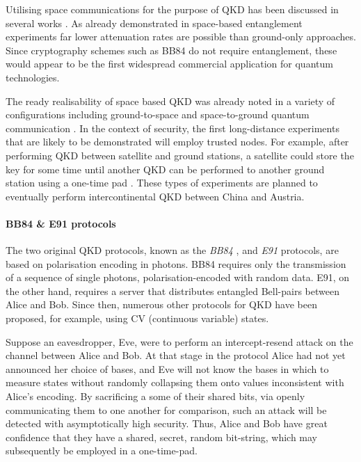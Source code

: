 Utilising space communications for the purpose of QKD has been discussed in several works \cite{bib:hughes2000quantum, bib:rarity2002ground, bib:pfennigbauer2003free, bib:aspelmeyer2003long, bib:armengol08}. As already demonstrated in space-based entanglement experiments \cite{bib:yin2017satellite, bib:ren2017ground, bib:liao2017satellite} far lower attenuation rates are possible than ground-only approaches. Since cryptography schemes such as BB84 do not require entanglement, these would appear to be the first widespread commercial application for quantum technologies.  

The ready realisability of space based QKD was already noted in a variety of configurations including ground-to-space and space-to-ground quantum communication \cite{bib:rarity2002ground, bib:aspelmeyer2003long}. In the context of security, the first long-distance experiments that are likely to be demonstrated will employ trusted nodes. For example, after performing QKD between satellite and ground stations, a satellite could store the key for some time until another QKD can be performed to another ground station using a one-time pad \cite{bib:liao2017satellite}. These types of experiments are planned to eventually perform intercontinental QKD between China and Austria.  

%
%

\paragraph{BB84 \& E91 protocols}

The two original QKD protocols, known as the \textit{BB84} \cite{bib:BennetBrassard84}, and \textit{E91} \cite{bib:Ekert91} protocols, are based on polarisation encoding in photons. BB84 requires only the transmission of a sequence of single photons, polarisation-encoded with random data. E91, on the other hand, requires a server that distributes entangled Bell-pairs between Alice and Bob. Since then, numerous other protocols for QKD have been proposed, for example, using CV (continuous variable) states.

Suppose an eavesdropper, Eve, were to perform an intercept-resend attack on the channel between Alice and Bob. At that stage in the protocol Alice had not yet announced her choice of bases, and Eve will not know the bases in which to measure states without randomly collapsing them onto values inconsistent with Alice's encoding. By sacrificing a some of their shared bits, via openly communicating them to one another for comparison, such an attack will be detected with asymptotically high security. Thus, Alice and Bob have great confidence that they have a shared, secret, random bit-string, which may subsequently be employed in a one-time-pad.

